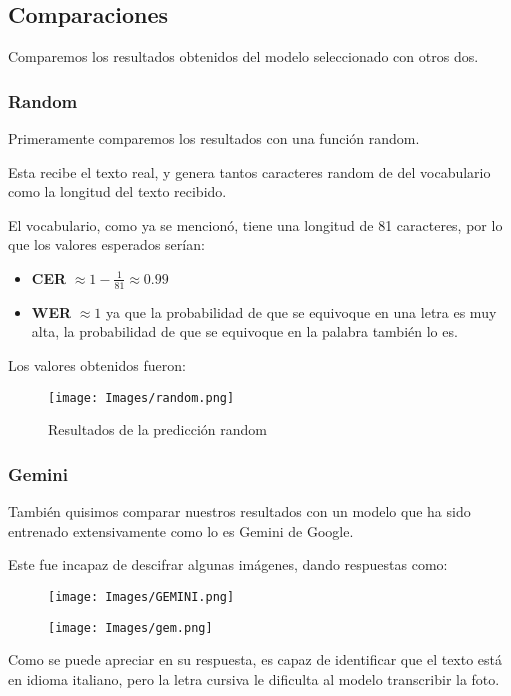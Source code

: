 \documentclass{article}
\begin{document}
\newpage
\subsection{Comparaciones}
Comparemos los resultados obtenidos del modelo seleccionado con otros dos.
\subsubsection{Random}
Primeramente comparemos los resultados con una función random.

Esta recibe el texto real, y genera tantos caracteres random de del vocabulario como la longitud del texto recibido.

El vocabulario, como ya se mencionó, tiene una longitud de 81 caracteres, por lo que los valores esperados serían: 
\begin{itemize}
    \item \textbf{CER} $ \approx 1 - \frac{1}{81} \approx  0.99$
    \item \textbf{WER} $ \approx 1 $ ya que la probabilidad de que se equivoque en una letra es muy alta, la probabilidad de que se equivoque en la palabra también lo es.
\end{itemize}

Los valores obtenidos fueron:
\begin{figure}[h]
    \centering
    \texttt{[image: Images/random.png]}
    \caption{Resultados de la predicción random}
    \label{fig:enter-label}
\end{figure}

\subsubsection{Gemini}
También quisimos comparar nuestros resultados con un modelo que ha sido entrenado extensivamente como lo es Gemini de Google.

Este fue incapaz de descifrar algunas imágenes, dando respuestas como:
\begin{figure}[H]
    \centering
    \texttt{[image: Images/GEMINI.png]}
    \label{fig:enter-label}
\end{figure}

\begin{figure}[H]
    \centering
    \texttt{[image: Images/gem.png]}
    \label{fig:enter-label}
\end{figure}

Como se puede apreciar en su respuesta, es capaz de identificar que el texto está en idioma italiano, pero la letra cursiva le dificulta al modelo transcribir la foto.
\end{document}
